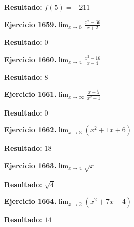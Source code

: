 \documentclass[10pt,a4paper]{article}
\begin{document}
\begin{solbox}
\textbf{Resultado:} \(\displaystyle f(5) = -211\)
\end{solbox}

\begin{ejbox}
\textbf{Ejercicio 1659.}\quad $\lim_{x\to 6} \frac{x^2-36}{x+2}$
\end{ejbox}

\begin{solbox}
\textbf{Resultado:} \(\displaystyle 0\)
\end{solbox}

\newpage
\begin{ejbox}
\textbf{Ejercicio 1660.}\quad $\lim_{x\to 4} \frac{x^2-16}{x-4}$
\end{ejbox}

\begin{solbox}
\textbf{Resultado:} \(\displaystyle 8\)
\end{solbox}

\begin{ejbox}
\textbf{Ejercicio 1661.}\quad $\lim_{x\to \infty} \frac{x + 5}{x^2 + 1}$
\end{ejbox}

\begin{solbox}
\textbf{Resultado:} \(\displaystyle 0\)
\end{solbox}

\begin{ejbox}
\textbf{Ejercicio 1662.}\quad $\lim_{x\to 3} (x^2 +1x +6)$
\end{ejbox}

\begin{solbox}
\textbf{Resultado:} \(\displaystyle 18\)
\end{solbox}

\newpage
\begin{ejbox}
\textbf{Ejercicio 1663.}\quad $\lim_{x\to 4} \sqrt{x}$
\end{ejbox}

\begin{solbox}
\textbf{Resultado:} \(\displaystyle \sqrt{4}\)
\end{solbox}

\begin{ejbox}
\textbf{Ejercicio 1664.}\quad $\lim_{x\to 2} (x^2 +7x -4)$
\end{ejbox}

\begin{solbox}
\textbf{Resultado:} \(\displaystyle 14\)
\end{solbox}
\end{document}
